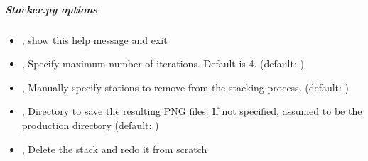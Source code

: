 \documentclass[letterpaper,10pt,english]{sphinxmanual}
\begin{document}
\subparagraph{Stacker.py options}
\label{\detokenize{pgamit.com:Stacker.py-options}}\begin{itemize}
\item {} 
\sphinxAtStartPar
{\hyperref[\detokenize{pgamit.com:Stacker.py--h}]{}}, {\hyperref[\detokenize{pgamit.com:Stacker.py---help}]{}} \sphinxhyphen{} show this help message and exit

\item {} 
\sphinxAtStartPar
{\hyperref[\detokenize{pgamit.com:Stacker.py--max}]{}} , {\hyperref[\detokenize{pgamit.com:Stacker.py---max_iters}]{}}  \sphinxhyphen{} Specify maximum number of iterations. Default is 4. (default: )

\item {} 
\sphinxAtStartPar
{\hyperref[\detokenize{pgamit.com:Stacker.py--exclude}]{}} , {\hyperref[\detokenize{pgamit.com:Stacker.py---exclude_stations}]{}}  \sphinxhyphen{} Manually specify stations to remove from the stacking process. (default: )

\item {} 
\sphinxAtStartPar
{\hyperref[\detokenize{pgamit.com:Stacker.py--dir}]{}} , {\hyperref[\detokenize{pgamit.com:Stacker.py---directory}]{}}  \sphinxhyphen{} Directory to save the resulting PNG files. If not specified, assumed to be the production directory (default: )

\item {} 
\sphinxAtStartPar
{\hyperref[\detokenize{pgamit.com:Stacker.py--redo}]{}}, {\hyperref[\detokenize{pgamit.com:Stacker.py---redo_stack}]{}} \sphinxhyphen{} Delete the stack and redo it from scratch


\end{itemize}
\end{document}
